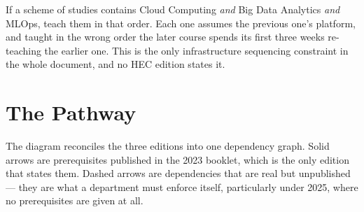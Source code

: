 \documentclass[11pt,a4paper,oneside]{report}
\begin{document}
\begin{recbox}
If a scheme of studies contains Cloud Computing \emph{and} Big Data Analytics
\emph{and} MLOps, teach them in that order. Each one assumes the previous one's
platform, and taught in the wrong order the later course spends its first three
weeks re-teaching the earlier one. This is the only infrastructure sequencing
constraint in the whole document, and no HEC edition states it.
\end{recbox}

\Needspace*{0.80\textheight}

\section{The Pathway}

The diagram reconciles the three editions into one dependency graph. Solid arrows
are prerequisites published in the 2023 booklet, which is the only edition that
states them. Dashed arrows are dependencies that are real but unpublished --- they
are what a department must enforce itself, particularly under 2025, where no
prerequisites are given at all.
\end{document}
